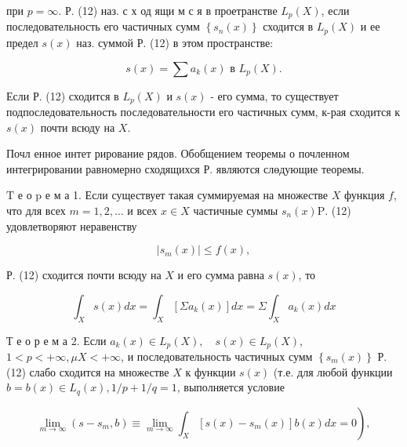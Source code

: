 \documentclass[10pt]{article}
\begin{document}
при $p=\infty$. Р. (12) наз. с х од ящи м с я в проетранстве $L_{p}(X)$, если последовательность его частичных сумм $\left\{s_{n}(x)\right\}$ сходится в $L_{p}(X)$ и ее предел $s(x)$ наз. суммой Р. (12) в этом пространстве:



\[

s(x)=\sum a_{k}(x) \text { в } L_{p}(X) .

\]



Если Р. (12) сходится в $L_{p}(X)$ и $s(x)$ - его сумма, то существует подпоследовательность последовательности его частичных сумм, к-рая сходится к $s(x)$ почти всюду на $X$.



Почл енное интет рирование рядов. Обобщением теоремы о почленном интегрировании равномерно сходящихся Р. являются слөдующие теоремы.



$\mathrm{T}$ е о $\mathrm{p}$ е м а 1. Если существует такая суммируемая на множестве $X$ функция $f$, что для всех $m=1,2, \ldots$ и всех $x \in X$ частичные суммы $s_{n}(x) \mathrm{P}$. (12) удовлетворяют неравенству



\[

\left|s_{m}(x)\right| \leqslant f(x),

\]



Р. (12) сходится почти всюду на $X$ и его сумма равна $s(x)$, то



\[

\int_{X} s(x) d x=\int_{X}\left[\Sigma a_{k}(x)\right] d x=\Sigma \int_{X} a_{k}(x) d x

\]



Т е о р е м а 2. Если $a_{k}(x) \in L_{p}(X), \quad s(x) \in L_{p}(X)$, $1<p<+\infty, \mu X<+\infty$, и последовательность частичных сумм $\left\{s_{m}(x)\right\}$ Р. (12) слабо сходится на множестве $X$ к функции $s(x)$ (т.е. для любой функции $b=b(x) \in L_{q}(x), 1 / p+1 / q=1$, выполняется условие



\[

\left.\lim _{m \rightarrow \infty}\left(s-s_{m}, b\right) \equiv \lim _{m \rightarrow \infty} \int_{X}\left[s(x)-s_{m}(x)\right] b(x) d x=0\right),

\]
\end{document}
